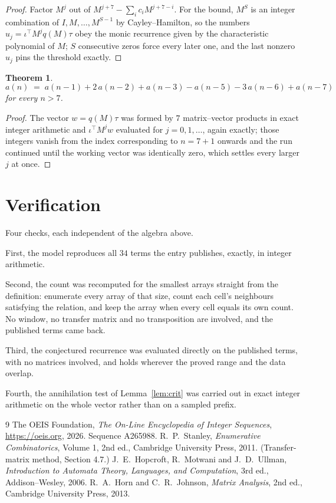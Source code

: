 \documentclass[11pt,a4paper]{article}
\theoremstyle{plain}
\newtheorem{theorem}{Theorem}
\theoremstyle{definition}
\begin{document}
\begin{proof}
Factor $M^{j}$ out of $M^{j+7}-\sum_ic_iM^{j+7-i}$. For the bound, $M^{S}$
is an integer combination of $I,M,\dots,M^{S-1}$ by Cayley--Hamilton, so the numbers
$u_j=\iota^{\!\top}M^{j}q(M)\tau$ obey the monic recurrence given by the characteristic
polynomial of $M$; $S$ consecutive zeros force every later one, and the last nonzero $u_j$
pins the threshold exactly.
\end{proof}

\begin{theorem}
\[
a(n)\;=\;a(n-1) + 2\,a(n-2) + a(n-3) - a(n-5) - 3\,a(n-6) + a(n-7)
\]
for every $n>7$.
\end{theorem}

\begin{proof}
The vector $w=q(M)\tau$ was formed by $7$ matrix--vector products in exact integer
arithmetic and $\iota^{\!\top}M^{j}w$ evaluated for $j=0,1,\dots$, again exactly; those
integers vanish from the index corresponding to $n=7+1$ onwards and the run continued
until the working vector was identically zero, which settles every larger $j$ at once.
\end{proof}

\section{Verification}

Four checks, each independent of the algebra above.

First, the model reproduces all $34$ terms the entry publishes, exactly, in integer
arithmetic.

Second, the count was recomputed for the smallest arrays straight from the definition:
enumerate every array of that size, count each cell's neighbours satisfying the relation, and
keep the array when every cell equals its own count. No window, no transfer matrix and no
transposition are involved, and the published terms came back.

Third, the conjectured recurrence was evaluated directly on the published terms, with no
matrices involved, and holds wherever the proved range and the data overlap.

Fourth, the annihilation test of Lemma~\ref{lem:crit} was carried out in exact integer
arithmetic on the whole vector rather than on a sampled prefix.

\begin{thebibliography}{9}
 The OEIS Foundation, \emph{The On-Line Encyclopedia of Integer
Sequences}, \url{https://oeis.org}, 2026. Sequence A265988.
 R.~P.~Stanley, \emph{Enumerative Combinatorics}, Volume 1, 2nd ed.,
Cambridge University Press, 2011. (Transfer-matrix method, Section 4.7.)
 J.~E.~Hopcroft, R.~Motwani and J.~D.~Ullman, \emph{Introduction to Automata
Theory, Languages, and Computation}, 3rd ed., Addison--Wesley, 2006.
 R.~A.~Horn and C.~R.~Johnson, \emph{Matrix Analysis}, 2nd ed., Cambridge
University Press, 2013.
\end{thebibliography}
\end{document}
